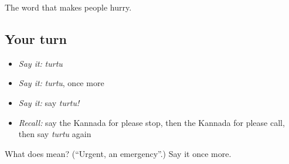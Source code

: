 \begin{grammarlens}[title={What you've built}]
The word that makes people hurry.
\end{grammarlens}

\subsection*{Your turn}
\begin{itemize}
\raggedright
  \item \emph{Say it:} \emph{turtu}
  \item \emph{Say it:} \emph{turtu}, once more
  \item \emph{Say it:} say \emph{turtu!}
  \item \emph{Recall:} say the Kannada for please stop, then the Kannada for please call, then say \emph{turtu} again
\end{itemize}

\begin{tcolorbox}[breakable,colback=teal!4,colframe=teal!35!black,title={Before you move on}]
What does  mean? (\textquotedblleft{}Urgent, an emergency\textquotedblright{}.) Say it once more.
\end{tcolorbox}
